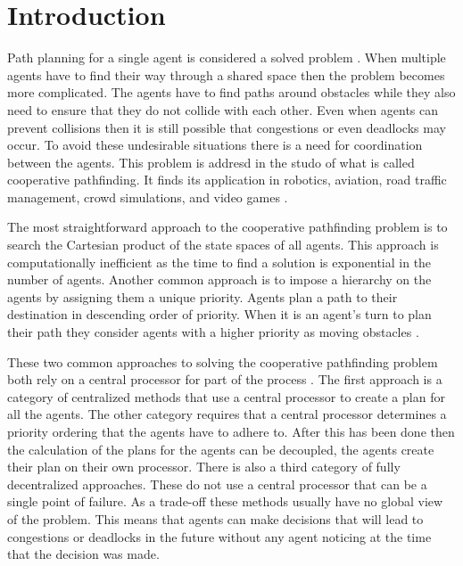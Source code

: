 \section{Introduction}\label{sec:intro}
Path planning for a single agent is considered a solved problem 
\cite{sharon2013}. When multiple agents have to find their way through a shared 
space then the problem becomes more complicated. The agents have to find paths 
around obstacles while they also need to ensure that they do not collide with 
each other. Even when agents can prevent collisions then it is still possible 
that congestions or even deadlocks may occur. To avoid these undesirable 
situations there is a need for coordination between the agents. This problem is 
addresd in the studo of what is called cooperative pathfinding. It finds its 
application in robotics, aviation, road traffic management, crowd simulations, 
and video games \cite{standley2011}.

The most straightforward approach to the cooperative pathfinding problem
is to search the Cartesian product of the state spaces of all agents. This
approach is computationally inefficient \cite{sharon2013,hopcroft1984} as the 
time to find a solution is exponential in the number of agents. Another common 
approach is to impose a hierarchy on the agents by assigning them a unique 
priority. Agents plan a path to their destination in descending order of 
priority. When it is an agent's turn to plan their path they consider agents 
with a higher priority as moving obstacles \cite{bennewitz2002}.

These two common approaches to solving the cooperative pathfinding problem both
rely on a central processor for part of the process \cite{standley2010}. The 
first approach is a category of centralized methods that use a central 
processor to create a plan for all the agents. The other category requires that 
a central processor determines a priority ordering that the agents have to 
adhere to. After this has been done then the calculation of the plans for the 
agents can be decoupled, the agents create their plan on their own processor. 
There is also a third category of fully decentralized approaches. These do not 
use a central processor that can be a single point of failure. As a trade-off 
these methods usually have no global view of the problem. This means that 
agents can make decisions that will lead to congestions or deadlocks in the 
future without any agent noticing at the time that the decision was made.

